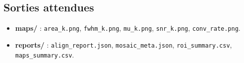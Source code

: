 \subsection{Sorties attendues}
\begin{itemize}[nosep]
\item \textbf{maps/} : \texttt{area\_k.png}, \texttt{fwhm\_k.png}, \texttt{mu\_k.png}, \texttt{snr\_k.png}, \texttt{conv\_rate.png}.
\item \textbf{reports/} : \texttt{align\_report.json}, \texttt{mosaic\_meta.json}, \texttt{roi\_summary.csv}, \texttt{maps\_summary.csv}.
\end{itemize}
